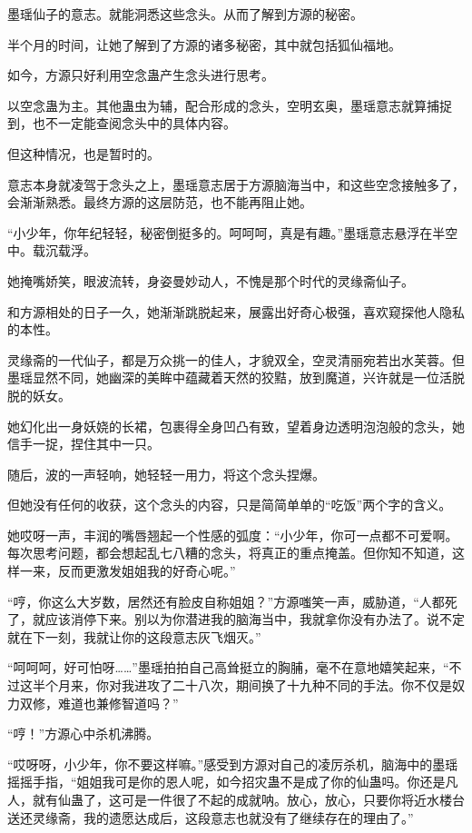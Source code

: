 \begin{this_body}
墨瑶仙子的意志。就能洞悉这些念头。从而了解到方源的秘密。

半个月的时间，让她了解到了方源的诸多秘密，其中就包括狐仙福地。

如今，方源只好利用空念蛊产生念头进行思考。

以空念蛊为主。其他蛊虫为辅，配合形成的念头，空明玄奥，墨瑶意志就算捕捉到，也不一定能查阅念头中的具体内容。

但这种情况，也是暂时的。

意志本身就凌驾于念头之上，墨瑶意志居于方源脑海当中，和这些空念接触多了，会渐渐熟悉。最终方源的这层防范，也不能再阻止她。

“小少年，你年纪轻轻，秘密倒挺多的。呵呵呵，真是有趣。”墨瑶意志悬浮在半空中。载沉载浮。

她掩嘴娇笑，眼波流转，身姿曼妙动人，不愧是那个时代的灵缘斋仙子。

和方源相处的日子一久，她渐渐跳脱起来，展露出好奇心极强，喜欢窥探他人隐私的本性。

灵缘斋的一代仙子，都是万众挑一的佳人，才貌双全，空灵清丽宛若出水芙蓉。但墨瑶显然不同，她幽深的美眸中蕴藏着天然的狡黠，放到魔道，兴许就是一位活脱脱的妖女。

她幻化出一身妖娆的长裙，包裹得全身凹凸有致，望着身边透明泡泡般的念头，她信手一捉，捏住其中一只。

随后，波的一声轻响，她轻轻一用力，将这个念头捏爆。

但她没有任何的收获，这个念头的内容，只是简简单单的“吃饭”两个字的含义。

她哎呀一声，丰润的嘴唇翘起一个性感的弧度：“小少年，你可一点都不可爱啊。每次思考问题，都会想起乱七八糟的念头，将真正的重点掩盖。但你知不知道，这样一来，反而更激发姐姐我的好奇心呢。”

“哼，你这么大岁数，居然还有脸皮自称姐姐？”方源嗤笑一声，威胁道，“人都死了，就应该消停下来。别以为你潜进我的脑海当中，我就拿你没有办法了。说不定就在下一刻，我就让你的这段意志灰飞烟灭。”

“呵呵呵，好可怕呀……”墨瑶拍拍自己高耸挺立的胸脯，毫不在意地嬉笑起来，“不过这半个月来，你对我进攻了二十八次，期间换了十九种不同的手法。你不仅是奴力双修，难道也兼修智道吗？”

“哼！”方源心中杀机沸腾。

“哎呀呀，小少年，你不要这样嘛。”感受到方源对自己的凌厉杀机，脑海中的墨瑶摇摇手指，“姐姐我可是你的恩人呢，如今招灾蛊不是成了你的仙蛊吗。你还是凡人，就有仙蛊了，这可是一件很了不起的成就呐。放心，放心，只要你将近水楼台送还灵缘斋，我的遗愿达成后，这段意志也就没有了继续存在的理由了。”


\end{this_body}
